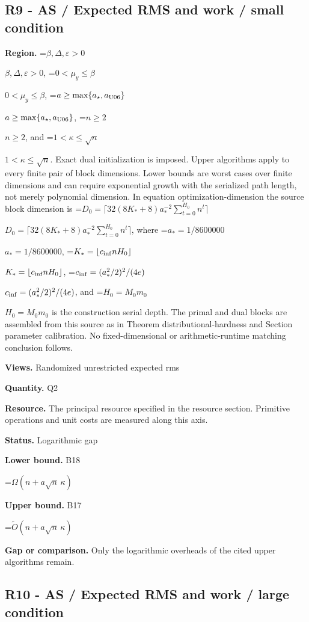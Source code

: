 \documentclass[10pt,a4paper]{article}
\newcommand{\AtlasMath}[1]{\par\begingroup\centering\setbox0=\hbox{$\displaystyle #1$}\ifdim\wd0>1.4\linewidth\typeout{ATLAS WIDE FORMULA: \the\wd0}\fi\ifdim\wd0>\linewidth\resizebox{\linewidth}{!}{\box0}\else\box0\fi\par\endgroup}
\newcommand{\AtlasInlineMath}[1]{\begingroup\setbox0=\hbox{$#1$}\ifdim\wd0>.4\linewidth\endgroup\AtlasMath{#1}\else\endgroup$#1$\fi}
\begin{document}
\subsection{R9 - AS / Expected RMS and work / small condition}


\textbf{Region.} \AtlasInlineMath{\beta,\Delta,\varepsilon>0}, \AtlasInlineMath{0<\mu_y\le\beta}, \AtlasInlineMath{a\ge\max\{a_\star,a_{\rm U06}\}}, \AtlasInlineMath{n\ge2}, and \AtlasInlineMath{1<\kappa\le\sqrt n}. Exact dual initialization is imposed. Upper algorithms apply to every finite pair of block dimensions. Lower bounds are worst cases over finite dimensions and can require exponential growth with the serialized path length, not merely polynomial dimension. In equation optimization-dimension the source block dimension is \AtlasInlineMath{D_0=\lceil32(8K_*+8)a_*^{-2}\sum_{t=0}^{H_0}n^t\rceil}, where \AtlasInlineMath{a_*=1/8600000}, \AtlasInlineMath{K_*=\lfloor c_{\rm inf}nH_0\rfloor}, \AtlasInlineMath{c_{\rm inf}=(a_*^2/2)^2/(4e)}, and \AtlasInlineMath{H_0=M_0m_0} is the construction serial depth. The primal and dual blocks are assembled from this source as in Theorem distributional-hardness and Section parameter calibration. No fixed-dimensional or arithmetic-runtime matching conclusion follows.



\textbf{Views.} Randomized unrestricted expected rms



\textbf{Quantity.} Q2



\textbf{Resource.} The principal resource specified in the resource section. Primitive operations and unit costs are measured along this axis.



\textbf{Status.} Logarithmic gap



\textbf{Lower bound.} B18



\AtlasMath{\Omega(n+a\sqrt n\,\kappa)}


\textbf{Upper bound.} B17



\AtlasMath{\widetilde O(n+a\sqrt n\,\kappa)}


\textbf{Gap or comparison.} Only the logarithmic overheads of the cited upper algorithms remain.



\subsection{R10 - AS / Expected RMS and work / large condition}
\end{document}
